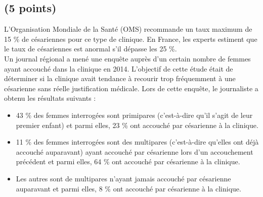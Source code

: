 \begin{questions}
\end{questions}

\subsection{(5 points)}

L'Organisation Mondiale de la Santé (OMS) recommande un taux maximum de 15 \% de césariennes pour ce type de clinique. En France, les experts estiment que le taux de césariennes est anormal s'il dépasse les 25 \%.\\

Un journal régional a mené une enquête auprès d'un certain nombre de femmes ayant accouché dans la clinique en 2014. L'objectif de cette étude était de déterminer si la clinique avait tendance à recourir trop fréquemment à une césarienne sans réelle justification médicale. Lors de cette enquête, le journaliste a obtenu les résultats suivants :

\begin{itemize}
	\item 43 \% des femmes interrogées sont primipares (c'est-à-dire qu'il s'agit de leur premier enfant) et parmi elles, 23 \% ont accouché par césarienne à la clinique.
	\item 11 \% des femmes interrogées sont des multipares (c'est-à-dire qu'elles ont déjà accouché auparavant) ayant accouché par césarienne lors d'un accouchement précédent et parmi elles, 64 \% ont accouché par césarienne à la clinique.
	\item Les autres sont de multipares n'ayant jamais accouché par césarienne auparavant et parmi elles, 8 \% ont accouché par césarienne à la clinique.	
\end{itemize}

